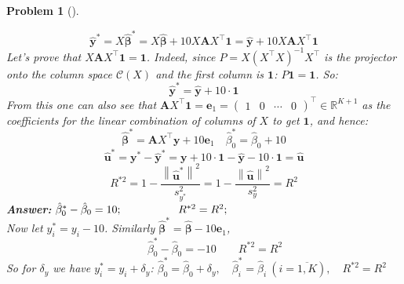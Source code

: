 \documentclass[12pt,a4]{article}
\newtheorem{problem}{Problem}
\newcommand{\bR}{{\mathbb R}}
\newcommand{\bu}{{\mathbf u}}
\newcommand{\bx}{{\mathbf x}}
\newcommand{\by}{{\mathbf y}}
\newcommand{\be}{{\mathbf e}}
\newcommand{\bA}{{\mathbf A}}
\newcommand{\bbeta}{{\pmb \beta}}
\newcommand{\one}{{\mathbf 1}}
\renewcommand{\Im}{{\mathcal C}}
\newcommand{\norm}[1]{\left\lVert#1\right\rVert}
\newcommand{\answer}[1]{\textbf{Answer:} #1}
\begin{document}
\begin{problem}[]
\begin{enumerate}[(a)]
\[\]
\[
\hat \by^* =
X\hat \bbeta^* =
X\hat \bbeta + 10 X\bA X^\top \one  =
\hat \by + 10 X\bA X^\top \one
\]
Let's prove that $X\bA X^\top\one = \one$. Indeed, since $P = X(X^\top X)^{-1} X^\top$ is the projector onto the column space $\Im(X)$ and the first column is $\one$: $P\one = \one$. So:
\[
\hat \by^* = \hat \by + 10 \cdot \one
\]
From this one can also see that $\bA X^\top\one = \be_1 = \begin{pmatrix}1 & 0 & \cdots & 0\end{pmatrix}^\top\in\bR^{K+1}$ as the coefficients for the linear combination of columns of $X$ to get $\one$, and hence:
\[
\hat \bbeta^* = \bA X^\top \by + 10 \be_1
\quad
\hat \beta^*_0 =\hat \beta_0 + 10
\]
\[
\hat \bu^* = \by^* - \hat \by^* =
\by + 10 \cdot \one - \hat \by - 10 \cdot \one =
\hat \bu
\]
\[
R^{*2} =
1 - \frac{\norm{\hat\bu^*}^2}{s^2_{y^*}} =
1 - \frac{\norm{\hat\bu}^2}{s^2_y} = R^2
\]
\answer{$
\hat \beta^*_0 - \hat \beta_0 = 10;\\[5pt]
\hspace*{18mm}
R^{*2} = R^2;
$}\\[5pt]
Now let $y_i^* = y_i - 10$. Similarly $\hat \bbeta^* = \hat \bbeta - 10\be_1$,
\[
\qquad
\hat \beta^*_0 - \hat \beta_0 = -10
\qquad
R^{*2} = R^2
\]
So for $\delta_y$ we have $y_i^* = y_i + \delta_y$: $\hat \beta^*_0 = \hat \beta_0 + \delta_y,
\quad
\hat \beta^*_i = \hat \beta_i ~(i=\overline{1,K}),
\quad
R^{*2} = R^2
$

\end{enumerate}
\end{problem}
\end{document}
